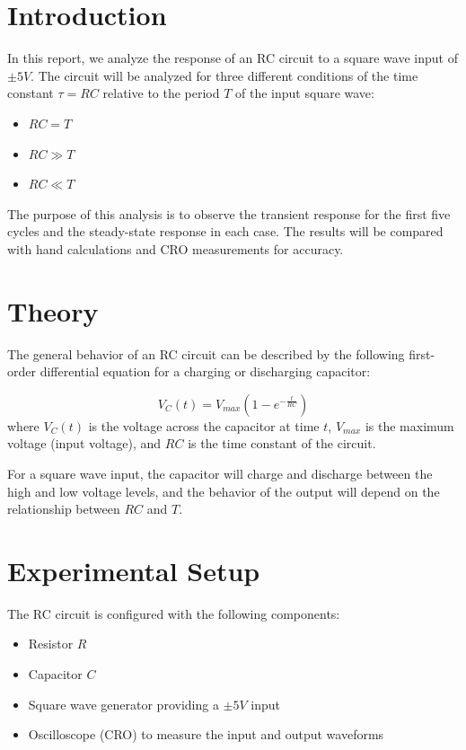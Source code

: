 \documentclass[a4paper,12pt]{article}
\begin{document}
\section*{Introduction}
In this report, we analyze the response of an RC circuit to a square wave input of $\pm 5V$. The circuit will be analyzed for three different conditions of the time constant \( \tau = RC \) relative to the period \( T \) of the input square wave:

\begin{itemize}
    \item \( RC = T \)
    \item \( RC \gg T \)
    \item \( RC \ll T \)
\end{itemize}

The purpose of this analysis is to observe the transient response for the first five cycles and the steady-state response in each case. The results will be compared with hand calculations and CRO measurements for accuracy.

\section*{Theory}
The general behavior of an RC circuit can be described by the following first-order differential equation for a charging or discharging capacitor:

\[
V_C(t) = V_{max} \left(1 - e^{-\frac{t}{RC}}\right)
\]
where \( V_C(t) \) is the voltage across the capacitor at time \( t \), \( V_{max} \) is the maximum voltage (input voltage), and \( RC \) is the time constant of the circuit.

For a square wave input, the capacitor will charge and discharge between the high and low voltage levels, and the behavior of the output will depend on the relationship between \( RC \) and \( T \).

\section*{Experimental Setup}
The RC circuit is configured with the following components:
\begin{itemize}
    \item Resistor \( R \)
    \item Capacitor \( C \)
    \item Square wave generator providing a \( \pm 5V \) input
    \item Oscilloscope (CRO) to measure the input and output waveforms
\end{itemize}
\end{document}
